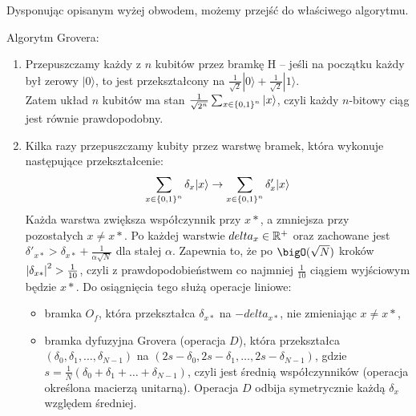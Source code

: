 Dysponując opisanym wyżej obwodem, możemy przejść do właściwego algorytmu.
\begin{greyframe}
    Algorytm Grovera:
    \begin{enumerate}
        \item Przepuszczamy każdy z \( n \) kubitów przez bramkę H -- jeśli na początku każdy był zerowy \( |0\rangle \), to jest przekształcony na \( \frac{1}{\sqrt{2}}|0\rangle + \frac{1}{\sqrt{2}}|1\rangle \). \\
        Zatem układ \( n \) kubitów ma stan \( \frac{1}{\sqrt{2^n}} \sum_{x \in \set{0,1}^n} |x\rangle \), czyli każdy \( n \)-bitowy ciąg jest równie prawdopodobny.
        \item Kilka razy przepuszczamy kubity przez warstwę bramek, która wykonuje następujące przekształcenie:
        \[
            \sum_{x \in \set{0,1}^n} \delta_x |x\rangle \rightarrow \sum_{x \in \set{0,1}^n} \delta'_x |x\rangle
        \]
        Każda warstwa zwiększa współczynnik przy \( x* \), a zmniejsza przy pozostałych \( x \neq x* \). Po każdej warstwie \( delta_x \in \mathbb{R}^{+} \)
        oraz zachowane jest \( \delta'_{x*} > \delta_{x*} + \frac{1}{\alpha\sqrt{N}} \) dla stałej \( \alpha \).
        Zapewnia to, że po  \( \bigO(\sqrt{N}) \) kroków \( \left\lvert\delta_{x*}\right\rvert^2 > \frac{1}{10} \), czyli z prawdopodobieństwem co najmniej \( \frac{1}{10} \) ciągiem wyjściowym będzie \( x* \).
        Do osiągnięcia tego służą operacje liniowe:
        \begin{itemize}
            \item bramka \( O_f \), która przekształca \( \delta_{x*} \) na \( -delta_{x*} \), nie zmieniając \( x \neq x* \),
            \item bramka dyfuzyjna Grovera (operacja \( D \)), która przekształca \( (\delta_0, \delta_1, \ldots, \delta_{N-1}) \) na \( (2s - \delta_0, 2s - \delta_1, \ldots, 2s - \delta_{N-1}) \),
            gdzie \( s = \frac{1}{N}(\delta_0 + \delta_1 + \ldots + \delta_{N-1}) \), czyli jest średnią współczynników (operacja określona macierzą unitarną).
            Operacja \( D \) odbija symetrycznie każdą \( \delta_x \) względem średniej.
        \end{itemize}
    \end{enumerate}
\end{greyframe}

